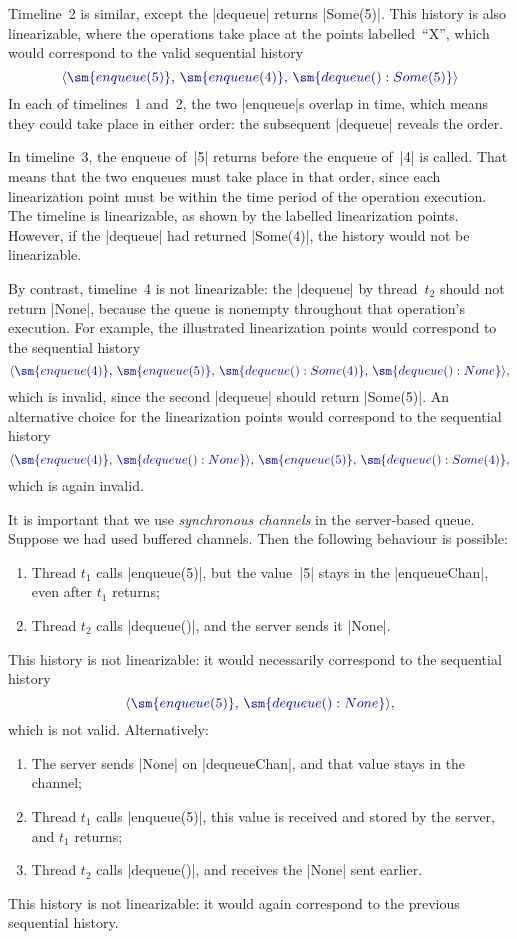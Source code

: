 
Timeline~2 is similar, except the |dequeue| returns |Some(5)|.  This history
is also linearizable, where the operations take place at the points
labelled~``{\scalashape X}'', which would correspond to the valid sequential
history
\[\mstyle
\seq{ \sm{enqueue(5)},\, \sm{enqueue(4)},\, \sm{dequeue():Some(5)}}
\]
In each of timelines~1 and~2, the two |enqueue|s overlap in time, which means
they could take place in either order: the subsequent |dequeue| reveals the
order. 


In timeline~3, the enqueue of~|5| returns before the enqueue of~|4| is
called.  That means that the two enqueues must take place in that order, since
each linearization point must be within the time period of the operation
execution.  The timeline is linearizable, as shown by the labelled
linearization points.  However, if the |dequeue| had returned |Some(4)|, the
history would not be linearizable. 

By contrast, timeline~4 is not linearizable: the |dequeue| by thread~$t_2$
should not return |None|, because the queue is nonempty throughout that
operation's execution.  For example, the illustrated linearization points
would correspond to the sequential history
\[\mstyle
\seq{ \sm{enqueue(4)},\, \sm{enqueue(5)},\,
   \sm{dequeue():Some(4)},\, \sm{dequeue():None}},
\]
which is invalid, since the second |dequeue| should return |Some(5)|.  An
alternative choice for the linearization points would correspond to the
sequential history 
\[\mstyle
\seq{ \sm{enqueue(4)},\, \sm{dequeue():None}},\, \sm{enqueue(5)},\,
   \sm{dequeue():Some(4)},
\]
which is again invalid.


It is important that we use \emph{synchronous channels} in the server-based
queue.  Suppose we had used buffered channels.  Then the following behaviour
is possible:
%
\begin{enumerate}
\item Thread $t_1$ calls |enqueue(5)|, but the value~|5| stays in the
  |enqueueChan|, even after $t_1$ returns;

\item Thread $t_2$ calls |dequeue()|, and the server sends it |None|.
\end{enumerate}
%
This history is not linearizable: it would necessarily correspond to the
sequential history
\[\mstyle
\seq{ \sm{enqueue(5)},\, \sm{dequeue():None}},
\]
which is not valid.
Alternatively:
%
\begin{enumerate}
\item The server sends |None| on |dequeueChan|, and that value stays in the
  channel; 

\item Thread $t_1$ calls |enqueue(5)|, this value is received and stored
  by the server, and $t_1$ returns;  

\item Thread $t_2$ calls |dequeue()|, and receives the |None| sent earlier.
\end{enumerate}
%
This history is not linearizable: it would again correspond to the previous
sequential history.

